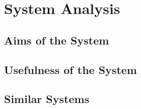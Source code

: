 \documentclass[12pt]{article} %
\begin{document}

\tableofcontents %

\newpage %





\section{System Analysis} %

\subsection{Aims of the System}



\subsection{Usefulness of the System} %


\subsection{Similar Systems} %

\newpage
\end{document}
